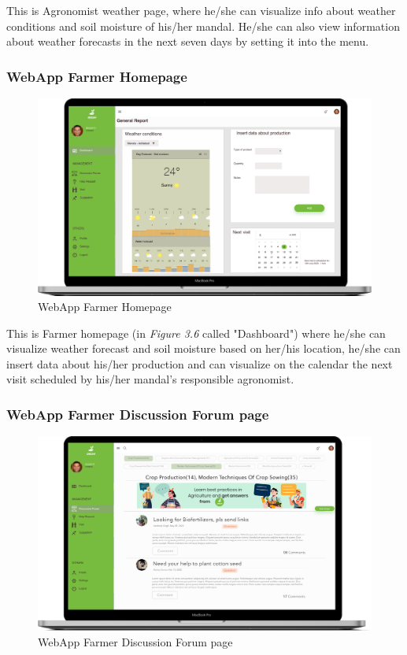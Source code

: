 This is Agronomist weather page, where he/she can visualize info about weather conditions and soil moisture of his/her mandal. He/she can also view information about weather forecasts in the next seven days by setting it into the menu.

\subsubsection{WebApp Farmer Homepage}

\begin{figure}[H]
  \centering
  \includegraphics[width=140mm,scale=0.9]{./Images//Mocks/WebApp/Farmer_Home.png}
  \caption{WebApp Farmer Homepage}
\end{figure}

This is Farmer homepage (in \textit{Figure 3.6} called "Dashboard") where he/she can visualize weather forecast and soil moisture based on her/his location, he/she can insert data about his/her production and can visualize on the calendar the next visit scheduled by his/her mandal's responsible agronomist.

\subsubsection{WebApp Farmer Discussion Forum page}

\begin{figure}[H]
  \centering
  \includegraphics[width=140mm,scale=0.9]{./Images//Mocks/WebApp/Farmer_Forum.png}
  \caption{WebApp Farmer Discussion Forum page}
\end{figure}

